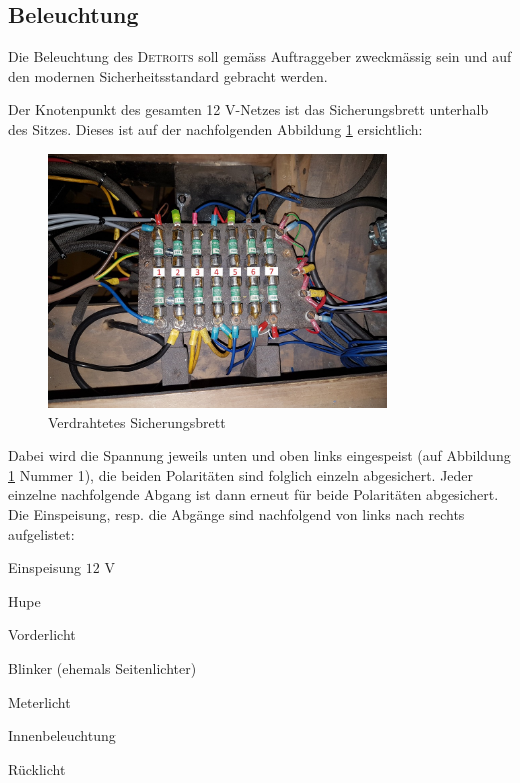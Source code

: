 \subsection{Beleuchtung}

Die Beleuchtung des \textsc{Detroits} soll gemäss Auftraggeber zweckmässig sein und auf den modernen Sicherheitsstandard gebracht werden.

\color{blue}
Der Knotenpunkt des gesamten 12 V-Netzes ist das Sicherungsbrett unterhalb des Sitzes. Dieses ist auf der nachfolgenden Abbildung \ref{fig:Sicherungsbrett} ersichtlich:

\begin{figure}[h!]
	\centering
		\includegraphics[width=0.8\textwidth]{images/Sicherungsbrett}
	\caption{Verdrahtetes Sicherungsbrett}
	\label{fig:Sicherungsbrett}
\end{figure}

Dabei wird die Spannung jeweils unten und oben links eingespeist (auf Abbildung \ref{fig:Sicherungsbrett} Nummer 1), die beiden Polaritäten sind folglich einzeln abgesichert. Jeder einzelne nachfolgende Abgang ist dann erneut für beide Polaritäten abgesichert. Die Einspeisung, resp. die Abgänge sind nachfolgend von links nach rechts aufgelistet:

\begin{compactenum}
\item Einspeisung $12$ V
\item Hupe
\item Vorderlicht
\item Blinker (ehemals Seitenlichter)
\item Meterlicht
\item Innenbeleuchtung
\item Rücklicht
\end{compactenum}

